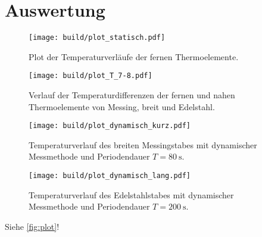 \section{Auswertung}
\label{sec:Auswertung}

\begin{figure}
  \centering
  \texttt{[image: build/plot\_statisch.pdf]}
  \caption{Plot der Temperaturverläufe der fernen Thermoelemente.}
  \label{fig:temperaturverlauf statisch, fern}
\end{figure}

\begin{figure}
  \centering
  \texttt{[image: build/plot\_T\_7-8.pdf]}
  \caption{Verlauf der Temperaturdifferenzen der fernen und nahen %
  Thermoelemente von Messing, breit und Edelstahl.}
  \label{fig:temperaturdifferenzen, messing, edelstahl}
\end{figure}

\begin{figure}
  \centering
  \texttt{[image: build/plot\_dynamisch\_kurz.pdf]}
  \caption{Temperaturverlauf des breiten Messingstabes mit dynamischer Messmethode und %
  Periodendauer $T=\qty{80}{\second}$.}
  \label{fig:temperaturdifferenzen, messing, edelstahl}
\end{figure}

\begin{figure}
  \centering
  \texttt{[image: build/plot\_dynamisch\_lang.pdf]} 
  \caption{Temperaturverlauf des Edelstahlstabes mit dynamischer Messmethode und %
  Periodendauer $T=\qty{200}{\second}$.}
  \label{fig:temperaturdifferenzen, messing, edelstahl}
\end{figure}

Siehe \autoref{fig:plot}!
